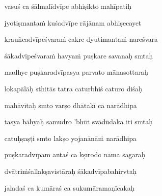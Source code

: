 vasuś ca śālmalīdvīpe abhiṣikto mahīpatiḥ\thinspace{\dandab} \dontdisplaylinenum

jyotiṣmanta\.m kuśadvīpe rājānam abhiṣecayet \veg\dontdisplaylinenum

krauñcadvīpeśvara\.m cakre dyutimanta\.m nareśvara\thinspace{\dandab} \dontdisplaylinenum

śākadvīpeśvara\.m havya\.m puṣkare savanaḥ smtaḥ \veg\dontdisplaylinenum

madhye puṣkaradvīpasya parvato mānasottaraḥ\thinspace{\dandab} \dontdisplaylinenum

lokapālāḥ sthitās tatra caturbhiś caturo diśaḥ \veg\dontdisplaylinenum

mahāvītaḥ smto varṣo dhātakī ca narādhipa\thinspace{\dandab} \dontdisplaylinenum

tasya bāhyaḥ samudro 'bhūt svādūdaka iti smtaḥ \veg\dontdisplaylinenum
            \var{\vo \om\ \Ed}%

catuḥṣaṣṭi smto lakṣo yojanānā\.m narādhipa\thinspace{\dandab} \dontdisplaylinenum

puṣkaradvīpam antaś ca kṣīrodo nāma sāgaraḥ \veg\dontdisplaylinenum

dvātri\.mśallakṣavistāraḥ śākadvīpabahirvtaḥ\thinspace{\dandab} \dontdisplaylinenum

jaladaś ca kumāraś ca sukumāramaṇīcakaḥ \veg\dontdisplaylinenum

